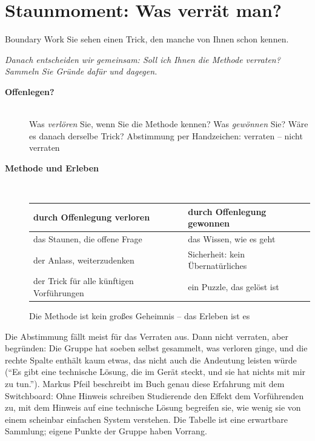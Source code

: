\section{Staunmoment: Was verrät man?}
\begin{staunbox}{Boundary Work}
Sie sehen einen Trick, den manche von Ihnen schon kennen.

\medskip
\emph{Danach entscheiden wir gemeinsam: Soll ich Ihnen die Methode
verraten? Sammeln Sie Gründe dafür und dagegen.}
\end{staunbox}
\os{\newpage}

\begin{description}
\item[{\rot\bf Offenlegen?}]~\\[-\lblskip]
\bi
  \ite Was \emph{verlören} Sie, wenn Sie die Methode kennen?
  \ite Was \emph{gewönnen} Sie?
  \ite Wäre es danach derselbe Trick?
  \ite Abstimmung per Handzeichen: verraten -- nicht verraten
\ei
\os{\newpage}

\item[{\rot\bf Methode und Erleben}]~\\[-\lblskip]
\begin{center}\nsl{\small}
\begin{tabular}{p{}p{}}
\toprule
\textbf{durch Offenlegung verloren} & \textbf{durch Offenlegung gewonnen} \\
\midrule
das Staunen, die offene Frage & das Wissen, wie es geht \\
der Anlass, weiterzudenken & Sicherheit: kein Übernatürliches \\
der Trick für alle künftigen Vorführungen & ein Puzzle, das gelöst ist \\
\bottomrule
\end{tabular}
\end{center}
\bi
  \ite Die Methode ist kein großes Geheimnis -- das Erleben ist es
\ei
\os{\newpage}
\end{description}

\begin{lehrhinweis}
Die Abstimmung fällt meist für das Verraten aus. Dann nicht verraten, aber
begründen: Die Gruppe hat soeben selbst gesammelt, was verloren ginge, und
die rechte Spalte enthält kaum etwas, das nicht auch die Andeutung leisten
würde (\enquote{Es gibt eine technische Lösung, die im Gerät steckt, und
sie hat nichts mit mir zu tun.}). Markus Pfeil beschreibt im Buch genau
diese Erfahrung mit dem Switchboard: Ohne Hinweis schreiben Studierende den
Effekt dem Vorführenden zu, mit dem Hinweis auf eine technische Lösung
begreifen sie, wie wenig sie von einem scheinbar einfachen System
verstehen. Die Tabelle ist eine erwartbare Sammlung; eigene Punkte der
Gruppe haben Vorrang.
\end{lehrhinweis}

